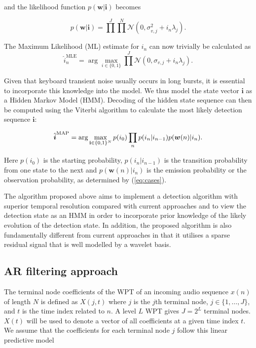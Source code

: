 and the likelihood function $p(\boldsymbol{w}|\boldsymbol{i})$ becomes

\begin{equation}\label{eq:likelihood1}
p(\boldsymbol{w}|\boldsymbol{i}) = \prod^J \prod^N \mathcal{N}(0,\sigma_{v,j}^2 + i_n\lambda_j).
\end{equation}

The Maximum Likelihood (ML) estimate for $i_n$ can now trivially be calculated as
\begin{equation}\label{eq:ml1}
\hat{i}_n^{\textrm{MLE}} = \arg\max_{i\in\{0,1\}} \prod^J \mathcal{N}(0,\sigma_{v,j} + i_n\lambda_j).
\end{equation}

Given that keyboard transient noise usually occurs in long bursts, it is essential to incorporate this knowledge into the model. We thus model the state vector $\boldsymbol{i}$ as a Hidden Markov Model (HMM). Decoding of the hidden state sequence can then be computed using the Viterbi algorithm to calculate the most likely detection sequence $\boldsymbol{i}$:

\begin{equation}\label{eq:viterbi}
\hat{\boldsymbol{i}}^{\textrm{MAP}} = \arg\max_{{\bf i}\in\{0,1\}^N} p(i_{0})\prod_n p(i_n | i_{n-1})p(\boldsymbol{w}(n) | i_n).
\end{equation}

Here $p(i_{0})$ is the starting probability, $p(i_n | i_{n-1})$ is the transition probability from one state to the next and $p(\boldsymbol{w}(n) | i_n)$ is the emission probability or the observation probability, as determined by (\ref{eq:cases}).

The algorithm proposed above aims to implement a detection algorithm with superior temporal resolution compared with current approaches and to view the detection state as an HMM in order to incorporate prior knowledge of the likely evolution of the detection state. In addition, the proposed algorithm is also fundamentally different from current approaches in that it utilises a sparse residual signal that is well modelled by a wavelet basis.


\subsection{AR filtering approach}

The terminal node coefficients of the WPT of an incoming audio sequence $x(n)$ of length $N$ is defined as $X(j,t)$ where $j$ is the $j$th terminal node, $j \in \{1, \ldots, J\}$, and $t$ is the time index related to $n$. A level $L$ WPT gives $J = 2^L$ terminal nodes. $X(t)$ will be used to denote a vector of all coefficients at a given time index $t$. We assume that the coefficients for each terminal node $j$ follow this linear predictive model

